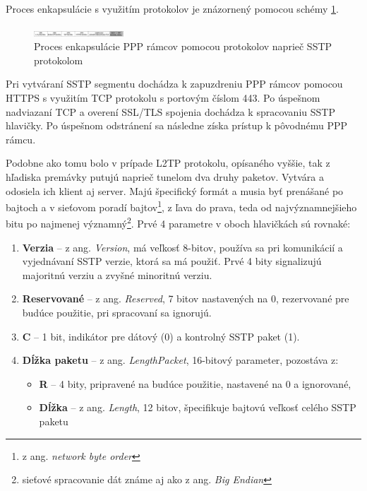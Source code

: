 Proces enkapsulácie s využitím protokolov je znázornený pomocou schémy \ref{sstpprotocolstack}. 
\begin{figure}[!h]
	\centering
	\includegraphics[width=0.3\textwidth]{figures/sstpprotocolstack}
	\caption{Proces enkapsulácie PPP rámcov pomocou protokolov naprieč SSTP protokolom}
	\label{sstpprotocolstack}
\end{figure}
Pri vytváraní SSTP segmentu dochádza k zapuzdreniu PPP rámcov pomocou HTTPS s využitím TCP protokolu s portovým číslom 443. Po úspešnom nadviazaní TCP a overení SSL/TLS spojenia dochádza k spracovaniu SSTP hlavičky. Po úspešnom odstránení sa následne získa prístup k pôvodnému PPP rámcu.   

Podobne ako tomu bolo v prípade L2TP protokolu, opísaného vyššie, tak z hľadiska premávky putujú naprieč tunelom dva druhy paketov. Vytvára a odosiela ich klient aj server. Majú špecifický formát a musia byť prenášané po bajtoch a v sieťovom poradí bajtov\footnote{z ang. \textit{network byte order}}, z ľava do prava, teda od najvýznamnejšieho bitu po najmenej významný\footnote{sieťové spracovanie dát známe aj ako z ang. \textit{Big Endian}}. Prvé 4 parametre v oboch hlavičkách sú rovnaké: 
\begin{enumerate}
	\item{\textbf{Verzia}} -- z ang. \textit{Version}, má veľkosť 8-bitov, používa sa pri komunikácií a vyjednávaní SSTP verzie, ktorá sa má použiť. Prvé 4 bity signalizujú majoritnú verziu a zvyšné minoritnú verziu. 
	\item{\textbf{Reservované}} -- z ang. \textit{Reserved}, 7 bitov nastavených na 0, rezervované pre budúce použitie, pri spracovaní sa ignorujú.
	\item{\textbf{C}} -- 1 bit, indikátor pre dátový (0) a kontrolný SSTP paket (1). 
	\item{\textbf{Dĺžka paketu}} -- z ang. \textit{LengthPacket}, 16-bitový parameter, pozostáva z:
		\begin{itemize}
			\item{\textbf{R}} -- 4 bity, pripravené na budúce použitie, nastavené na 0 a ignorované,
			\item{\textbf{Dĺžka}} -- z ang. \textit{Length}, 12 bitov, špecifikuje bajtovú veľkosť celého SSTP paketu
		\end{itemize}
\end{enumerate}
 
